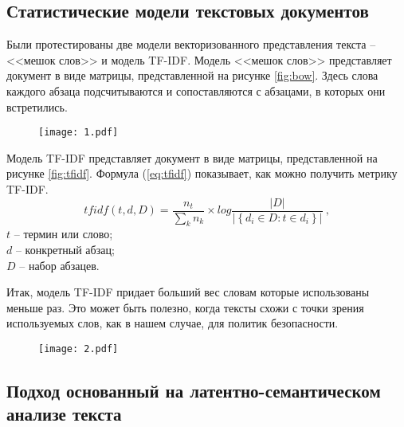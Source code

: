 \documentclass[../main]{subfiles}
\begin{document}
\subsection{Статистические модели текстовых документов}

Были протестированы две модели векторизованного представления текста -- <<мешок слов>> и модель TF-IDF. Модель <<мешок слов>> представляет документ в виде матрицы, представленной на рисунке \ref{fig:bow}. Здесь слова каждого абзаца подсчитываются и сопоставляются с абзацами, в которых они встретились.

\begin{figure}[H]
    \centering
    {\texttt{[image: 1.pdf]}}
    \vspace{-\baselineskip}
\end{figure}


Модель TF-IDF представляет документ в виде матрицы, представленной на рисунке \ref{fig:tfidf}. Формула (\ref{eq:tfidf}) показывает, как можно получить метрику TF-IDF.
\begin{equation}
    \label{eq:tfidf}
    tfidf(t, d, D) = \frac{n_t}{\displaystyle\sum_k n_k} \times 
    log \frac{ \big|{D}\big| }
    { \big|\left\{ d_i \in D : t \in d_i \right\}\big| }\ ,
\end{equation}
$t$ -- термин или слово;\\
\makebox[12.5mm]{}$d$ -- конкретный абзац;\\
\makebox[12.5mm]{}$D$ -- набор абзацев. 

Итак, модель TF-IDF придает больший вес словам которые использованы меньше раз. Это может быть полезно, когда тексты схожи с точки зрения используемых слов, как в нашем случае, для политик безопасности.

\begin{figure}[H]
    \centering
    {\texttt{[image: 2.pdf]}}
    \vspace{-\baselineskip}
\end{figure}

\subsection{Подход основанный на латентно-семантическом анализе текста}
\end{document}
